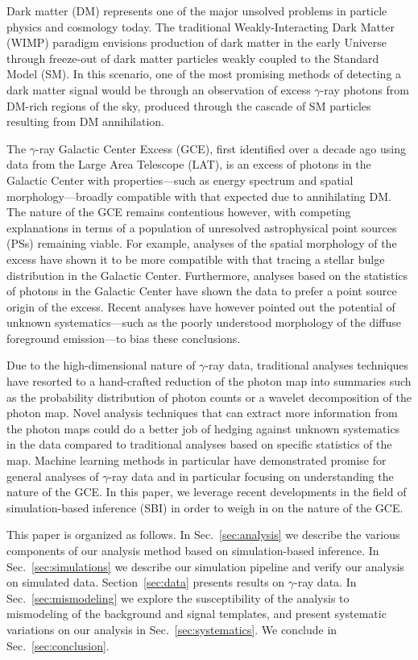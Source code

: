 \documentclass[prd,aps,10pt,nofootinbib,twocolumn,superscriptaddress,preprintnumbers,balancelastpage,longbibliography]{revtex4-1}
\begin{document}
Dark matter (DM) represents one of the major unsolved problems in particle physics and cosmology today. The traditional Weakly-Interacting Dark Matter (WIMP) paradigm envisions production of dark matter in the early Universe through freeze-out of dark matter particles weakly coupled to the Standard Model (SM). In this scenario, one of the most promising methods of detecting a dark matter signal would be through an observation of excess $\gamma$-ray photons from DM-rich regions of the sky, produced through the cascade of SM particles resulting from DM annihilation. 

The \Fermi $\gamma$-ray Galactic Center Excess (GCE), first identified over a decade ago using data from the \Fermi Large Area Telescope (LAT), is an excess of photons in the Galactic Center with properties---such as energy spectrum and spatial morphology---broadly compatible with that expected due to annihilating DM. The nature of the GCE remains contentious however, with competing explanations in terms of a population of unresolved astrophysical point sources (PSs) remaining viable. For example, analyses of the spatial morphology of the excess have shown it to be more compatible with that tracing a stellar bulge distribution in the Galactic Center. Furthermore, analyses based on the statistics of photons in the Galactic Center have shown the data to prefer a point source origin of the excess. Recent analyses have however pointed out the potential of unknown systematics---such as the poorly understood morphology of the diffuse foreground emission---to bias these conclusions.

 Due to the high-dimensional nature of $\gamma$-ray data, traditional analyses techniques have resorted to a hand-crafted reduction of the photon map into summaries such as the probability distribution of photon counts or a wavelet decomposition of the photon map. Novel analysis techniques that can extract more information from the photon maps could do a better job of hedging against unknown systematics in the data compared to traditional analyses based on specific statistics of the map. Machine learning methods in particular have demonstrated promise for general analyses of $\gamma$-ray data and in particular focusing on understanding the nature of the GCE. In this paper, we leverage recent developments in the field of simulation-based inference (SBI) in order to weigh in on the nature of the GCE.

This paper is organized as follows. In Sec.~\ref{sec:analysis} we describe the various components of our analysis method based on simulation-based inference. In Sec.~\ref{sec:simulations} we describe our simulation pipeline and verify our analysis on simulated data. Section~\ref{sec:data} presents results on \Fermi $\gamma$-ray data. In Sec.~\ref{sec:mismodeling} we explore the susceptibility of the analysis to mismodeling of the background and signal templates, and present systematic variations on our analysis in Sec.~\ref{sec:systematics}. We conclude in Sec.~\ref{sec:conclusion}.
\end{document}

